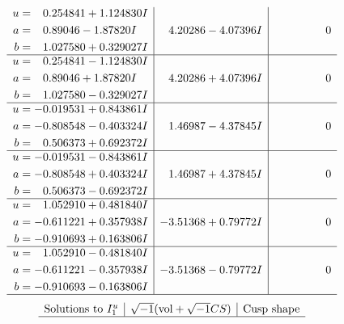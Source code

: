 \documentclass[1p]{elsarticle_modified}
\theoremstyle{definition}
\newcommand{\I}{\sqrt{-1}}
\begin{document}
$$\begin{array}{c|c|c}
\begin{aligned}
u &= \phantom{-}0.254841 + 1.124830 I \\
a &= \phantom{-}0.89046 - 1.87820 I \\
b &= \phantom{-}1.027580 + 0.329027 I\end{aligned}
 & \phantom{-}4.20286 - 4.07396 I & \phantom{-0.000000 } 0 \\ \hline\begin{aligned}
u &= \phantom{-}0.254841 - 1.124830 I \\
a &= \phantom{-}0.89046 + 1.87820 I \\
b &= \phantom{-}1.027580 - 0.329027 I\end{aligned}
 & \phantom{-}4.20286 + 4.07396 I & \phantom{-0.000000 } 0 \\ \hline\begin{aligned}
u &= -0.019531 + 0.843861 I \\
a &= -0.808548 - 0.403324 I \\
b &= \phantom{-}0.506373 + 0.692372 I\end{aligned}
 & \phantom{-}1.46987 - 4.37845 I & \phantom{-0.000000 } 0 \\ \hline\begin{aligned}
u &= -0.019531 - 0.843861 I \\
a &= -0.808548 + 0.403324 I \\
b &= \phantom{-}0.506373 - 0.692372 I\end{aligned}
 & \phantom{-}1.46987 + 4.37845 I & \phantom{-0.000000 } 0 \\ \hline\begin{aligned}
u &= \phantom{-}1.052910 + 0.481840 I \\
a &= -0.611221 + 0.357938 I \\
b &= -0.910693 + 0.163806 I\end{aligned}
 & -3.51368 + 0.79772 I & \phantom{-0.000000 } 0 \\ \hline\begin{aligned}
u &= \phantom{-}1.052910 - 0.481840 I \\
a &= -0.611221 - 0.357938 I \\
b &= -0.910693 - 0.163806 I\end{aligned}
 & -3.51368 - 0.79772 I & \phantom{-0.000000 } 0\\
 \hline 
 \end{array}$$\newpage$$\begin{array}{c|c|c}  
\text{Solutions to }I^u_{1}& \I (\text{vol} + \sqrt{-1}CS) & \text{Cusp shape}\\
 \hline 

\end{array}$$
\end{document}
